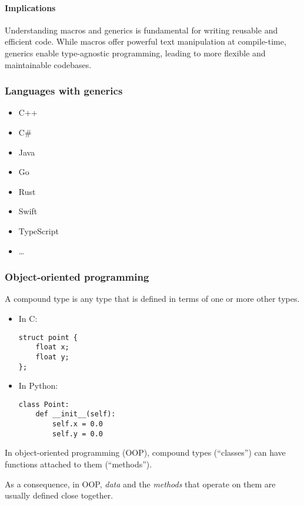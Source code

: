 \documentclass[12pt]{article}
\begin{document}
\paragraph{Implications}
Understanding macros and generics is fundamental for writing reusable and efficient code. While macros offer powerful text manipulation at compile-time, generics enable type-agnostic programming, leading to more flexible and maintainable codebases.

\subsubsection{Languages with generics}

\begin{itemize}
    \item C++
    \item C\#
    \item Java
    \item Go
    \item Rust
    \item Swift
    \item TypeScript
    \item \ldots
\end{itemize}




\subsubsection{Object-oriented programming}

A compound type is any type that is defined in terms of one or more other types.

\begin{itemize}
    \item In C:
\begin{verbatim}
struct point {
    float x;
    float y;
};
\end{verbatim}

    \item In Python:
\begin{verbatim}
class Point:
    def __init__(self):
        self.x = 0.0
        self.y = 0.0
\end{verbatim}
\end{itemize}

In object-oriented programming (OOP), compound types (``classes'')
can have functions attached to them (``methods'').

As a consequence, in OOP, \emph{data} and the \emph{methods} that operate on them are usually defined close together.
\end{document}
